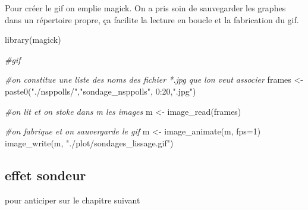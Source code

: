 \documentclass[
]{book}
\newenvironment{Shaded}{\begin{snugshade}}{\end{snugshade}}
\newcommand{\AttributeTok}[1]{\textcolor[rgb]{0.77,0.63,0.00}{#1}}
\newcommand{\CommentTok}[1]{\textcolor[rgb]{0.56,0.35,0.01}{\textit{#1}}}
\newcommand{\DecValTok}[1]{\textcolor[rgb]{0.00,0.00,0.81}{#1}}
\newcommand{\FunctionTok}[1]{\textcolor[rgb]{0.00,0.00,0.00}{#1}}
\newcommand{\NormalTok}[1]{#1}
\newcommand{\OtherTok}[1]{\textcolor[rgb]{0.56,0.35,0.01}{#1}}
\newcommand{\SpecialCharTok}[1]{\textcolor[rgb]{0.00,0.00,0.00}{#1}}
\newcommand{\StringTok}[1]{\textcolor[rgb]{0.31,0.60,0.02}{#1}}
\begin{document}
Pour créer le gif on emplie magick. On a pris soin de sauvegarder les graphes dans un répertoire propre, ça facilite la lecture en boucle et la fabrication du gif.

\begin{Shaded}
\begin{Highlighting}[]
\FunctionTok{library}\NormalTok{(magick)}

\CommentTok{\#gif                                                     }

\CommentTok{\#on constitue une liste des noms des fichier *.jpg que l\textquotesingle{}on veut associer                                                     }
\NormalTok{frames }\OtherTok{\textless{}{-}} \FunctionTok{paste0}\NormalTok{(}\StringTok{"./nsppolls/"}\NormalTok{,}\StringTok{"sondage\_nsppolls"}\NormalTok{, }\DecValTok{0}\SpecialCharTok{:}\DecValTok{20}\NormalTok{,}\StringTok{".jpg"}\NormalTok{)}

\CommentTok{\#on lit et on stoke dans m les images}
\NormalTok{m }\OtherTok{\textless{}{-}} \FunctionTok{image\_read}\NormalTok{(frames)}

\CommentTok{\#on fabrique et on sauvergarde le gif}
\NormalTok{m }\OtherTok{\textless{}{-}} \FunctionTok{image\_animate}\NormalTok{(m, }\AttributeTok{fps=}\DecValTok{1}\NormalTok{)}
\FunctionTok{image\_write}\NormalTok{(m, }\StringTok{"./plot/sondages\_lissage.gif"}\NormalTok{)}
\end{Highlighting}
\end{Shaded}

\hypertarget{effet-sondeur}{%
\subsection{effet sondeur}\label{effet-sondeur}}

pour anticiper sur le chapitre suivant
\end{document}
